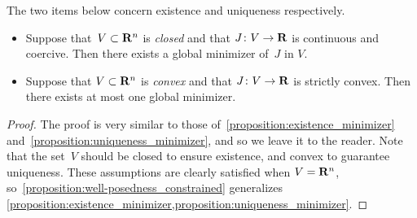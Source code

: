 \begin{proposition}
    \label{proposition:well-posedness_constrained}
    The two items below concern existence and uniqueness respectively.
    \begin{itemize}
        \item
            Suppose that~$V \subset \mathbf R^n$ is \emph{closed} and that $J \colon V \to \mathbf R$ is continuous and coercive.
            Then there exists a global minimizer of~$J$ in $V$.

        \item
            Suppose that $V \subset \mathbf R^n$ is \emph{convex} and that $J\colon V \to \mathbf R$ is strictly convex.
            Then there exists at most one global minimizer.
    \end{itemize}
\end{proposition}
\begin{proof}
    The proof is very similar to those of~\cref{proposition:existence_minimizer} and~\cref{proposition:uniqueness_minimizer},
    and so we leave it to the reader.
    Note that the set~$V$ should be closed to ensure existence,
    and convex to guarantee uniqueness.
    These assumptions are clearly satisfied when $V = \mathbf R^n$,
    so~\cref{proposition:well-posedness_constrained} generalizes \cref{proposition:existence_minimizer,proposition:uniqueness_minimizer}.
\end{proof}


